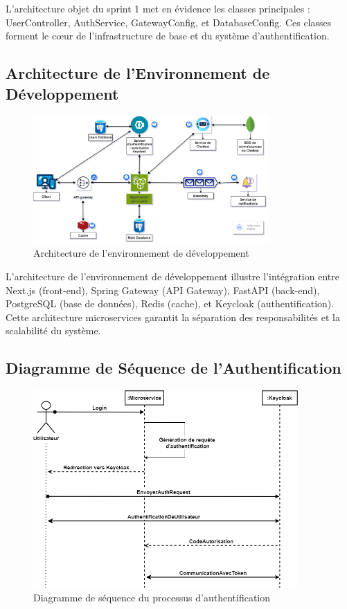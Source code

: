 L'architecture objet du sprint 1 met en évidence les classes principales : UserController, AuthService, GatewayConfig, et DatabaseConfig. Ces classes forment le cœur de l'infrastructure de base et du système d'authentification.

\subsection{Architecture de l'Environnement de Développement}

\begin{figure}[H]
\centering
\includegraphics[width=0.8\textwidth]{assets/images/architecture.png}
\caption{Architecture de l'environnement de développement}
\label{fig:dev-architecture}
\end{figure}

L'architecture de l'environnement de développement illustre l'intégration entre Next.js (front-end), Spring Gateway (API Gateway), FastAPI (back-end), PostgreSQL (base de données), Redis (cache), et Keycloak (authentification). Cette architecture microservices garantit la séparation des responsabilités et la scalabilité du système.

\subsection{Diagramme de Séquence de l'Authentification}

\begin{figure}[H]
\centering
\includegraphics[width=0.9\textwidth]{assets/images/keycloak-seq.png}
\caption{Diagramme de séquence du processus d'authentification}
\label{fig:auth-sequence}
\end{figure}

